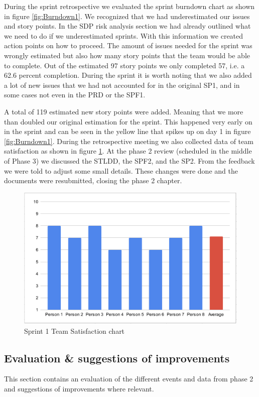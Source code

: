 \documentclass{article}
\begin{document}
During the sprint retrospective we evaluated the sprint burndown chart as shown in figure \ref{fig:Burndown1}. We recognized that we had underestimated our issues and story points. In the SDP risk analysis section we had already outlined what we need to do if we underestimated sprints. With this information we created action points on how to proceed. The amount of issues needed for the sprint was wrongly estimated but also how many story points that the team would be able to complete.  Out of the estimated 97 story points we only completed 57, i.e. a 62.6 percent completion. During the sprint it is worth noting that we also added a lot of new issues that we had not accounted for in the original SP1, and in some cases not even in the PRD or the SPF1.

A total of 119 estimated new story points were added. Meaning that we more than doubled our original estimation for the sprint. This happened very early on in the sprint and can be seen in the yellow line that spikes up on day 1 in figure \ref{fig:Burndown1}. During the retrospective meeting we also collected data of team satisfaction as shown in figure \ref{fig:Satisfaction1}. At the phase 2 review (scheduled in the middle of Phase 3) we discussed the STLDD, the SPF2, and the SP2. From the feedback we were told to adjust some small details. These changes were done and the documents were resubmitted, closing the phase 2 chapter.  

\begin{figure}[h!]
    \centering
    \includegraphics[scale=0.6]{pfrFigures/TeamSatisfaction1.png}
    \caption{Sprint 1 Team Satisfaction chart}
    \label{fig:Satisfaction1}
\end{figure}

\subsection{Evaluation \& suggestions of improvements}
This section contains an evaluation of the different events and data from phase 2 and suggestions of improvements where relevant.  
\end{document}
